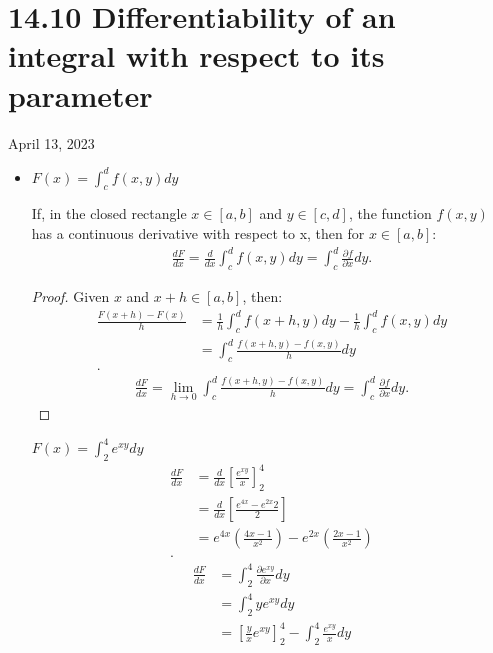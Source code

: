 \section{14.10 Differentiability of an integral with respect to its parameter}
April 13, 2023
\begin{itemize}
	\item $F\left( x \right)  = \int_c^d f\left( x,y \right) dy$ 
		\begin{theorem}
			If, in the closed rectangle $x \in [a,b]$ and  $y \in [c,d]$, the function  $f\left( x,y \right) $ has a continuous derivative with respect to x, then for $x\in[a,b]$:
			 \begin{align*}
				\frac{dF}{dx} = \frac{d}{dx} \int_c^d f\left( x,y \right) dy = \int_c^d \frac{\partial f}{\partial x} dy
			.\end{align*}
		\end{theorem}
		\begin{proof}
			Given $x$ and $x+h \in [a,b]$, then:
			\begin{align*}
				\frac{F(x+h) - F(x)}{h} &= \frac{1}{h}\int_c^df\left( x+h, y \right) dy - \frac{1}{h}\int_{c}^{d} f\left( x,y \right) dy\\
&= \int_{c}^{d} \frac{f\left( x+h,y \right) -f\left( x,y \right) }{h}dy  \\
			.\end{align*}
			\begin{align*}
				\frac{dF}{dx} = \lim_{h \to 0} \int_{c}^{d} \frac{f\left( x+h,y \right) -f\left( x,y \right) }{h}dy = \int_{c}^{d} \frac{\partial f}{\partial x} dy  
			.\end{align*}
		\end{proof}
		\begin{example}
			$F\left( x \right)  = \int_{2}^{4} e^{xy}dy $ 
			\begin{align*}
				\frac{dF}{dx} &= \frac{d}{dx}\left[ \frac{e^{xy}}{x} \right]_2^4 \\
				&= \frac{d}{dx}\left[ \frac{e^{4x}-e^{2x}2}{2} \right]  \\
				&= e^{4x}\left( \frac{4x-1}{x^2} \right) -e^{2x}\left( \frac{2x-1}{x^2} \right)  \\
			.\end{align*}
			\begin{align*}
				\frac{dF}{dx} &= \int_{2}^{4} \frac{\partial e^{xy}}{\partial x} dy \\
				&= \int_{2}^{4} ye^{xy}dy  \\
				&= \left[ \frac{y}{x} e^{xy} \right]_2^4 -\int_{2}^{4} \frac{e^{xy}}{x}dy \\

\end{align*}
\end{example}
\end{itemize}
